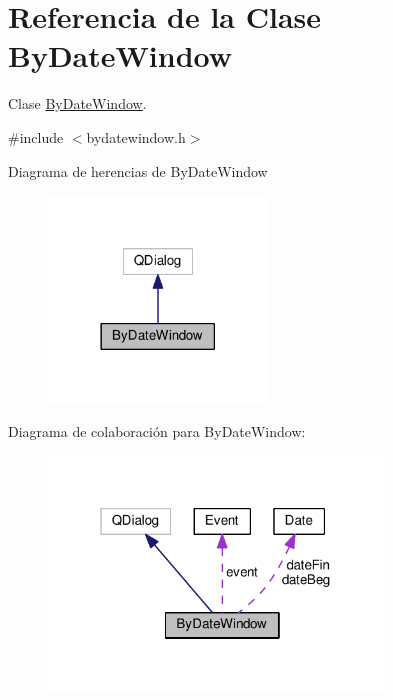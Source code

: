 \hypertarget{class_by_date_window}{}\section{Referencia de la Clase By\+Date\+Window}
\label{class_by_date_window}


Clase \hyperlink{class_by_date_window}{By\+Date\+Window}.  




{\ttfamily \#include $<$bydatewindow.\+h$>$}



Diagrama de herencias de By\+Date\+Window\nopagebreak
\begin{figure}[H]
\begin{center}
\leavevmode
\includegraphics[width=165pt]{class_by_date_window__inherit__graph}
\end{center}
\end{figure}


Diagrama de colaboración para By\+Date\+Window\+:\nopagebreak
\begin{figure}[H]
\begin{center}
\leavevmode
\includegraphics[width=253pt]{class_by_date_window__coll__graph}
\end{center}
\end{figure}
